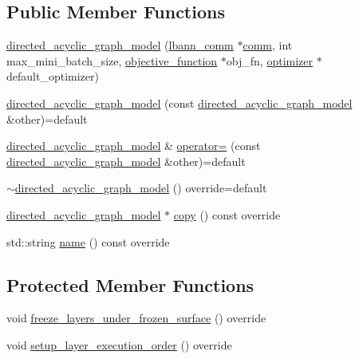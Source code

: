 \subsection*{Public Member Functions}
\begin{DoxyCompactItemize}
\item 
\hyperlink{classlbann_1_1directed__acyclic__graph__model_a2b5f8058b341073a0a95d4882fb4ff52}{directed\+\_\+acyclic\+\_\+graph\+\_\+model} (\hyperlink{classlbann_1_1lbann__comm}{lbann\+\_\+comm} $\ast$\hyperlink{file__io_8cpp_ab048c6f9fcbcfaa57ce68b00263dbebe}{comm}, int max\+\_\+mini\+\_\+batch\+\_\+size, \hyperlink{classlbann_1_1objective__function}{objective\+\_\+function} $\ast$obj\+\_\+fn, \hyperlink{classlbann_1_1optimizer}{optimizer} $\ast$default\+\_\+optimizer)
\item 
\hyperlink{classlbann_1_1directed__acyclic__graph__model_a72966559db324ced94953b46a820d9d0}{directed\+\_\+acyclic\+\_\+graph\+\_\+model} (const \hyperlink{classlbann_1_1directed__acyclic__graph__model}{directed\+\_\+acyclic\+\_\+graph\+\_\+model} \&other)=default
\item 
\hyperlink{classlbann_1_1directed__acyclic__graph__model}{directed\+\_\+acyclic\+\_\+graph\+\_\+model} \& \hyperlink{classlbann_1_1directed__acyclic__graph__model_a683d794c5d87534d9c5c3cbba814e199}{operator=} (const \hyperlink{classlbann_1_1directed__acyclic__graph__model}{directed\+\_\+acyclic\+\_\+graph\+\_\+model} \&other)=default
\item 
\hyperlink{classlbann_1_1directed__acyclic__graph__model_a2ad0b506b22f0c3f8b4aa49b66fad2f9}{$\sim$directed\+\_\+acyclic\+\_\+graph\+\_\+model} () override=default
\item 
\hyperlink{classlbann_1_1directed__acyclic__graph__model}{directed\+\_\+acyclic\+\_\+graph\+\_\+model} $\ast$ \hyperlink{classlbann_1_1directed__acyclic__graph__model_a6a21050a732686e9e6c9f384ff9fda51}{copy} () const override
\item 
std\+::string \hyperlink{classlbann_1_1directed__acyclic__graph__model_ad2b97ab2670e76538a754e28e19b5c94}{name} () const override
\end{DoxyCompactItemize}
\subsection*{Protected Member Functions}
\begin{DoxyCompactItemize}
\item 
void \hyperlink{classlbann_1_1directed__acyclic__graph__model_a9f2a6e9472235ec91c5a50356471b3cb}{freeze\+\_\+layers\+\_\+under\+\_\+frozen\+\_\+surface} () override
\item 
void \hyperlink{classlbann_1_1directed__acyclic__graph__model_a2a70d5719832c481db9fa962f6e5f2bd}{setup\+\_\+layer\+\_\+execution\+\_\+order} () override
\end{DoxyCompactItemize}
